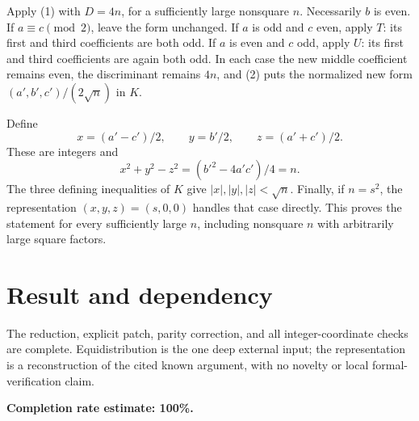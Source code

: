 \documentclass[11pt]{article}
\begin{document}
Apply (1) with $D=4n$, for a sufficiently large nonsquare $n$. Necessarily $b$ is even. If $a\equiv c\pmod2$, leave the form unchanged. If $a$ is odd and $c$ even, apply $T$: its first and third coefficients are both odd. If $a$ is even and $c$ odd, apply $U$: its first and third coefficients are again both odd. In each case the new middle coefficient remains even, the discriminant remains $4n$, and (2) puts the normalized new form $(a',b',c')/(2\sqrt n)$ in $K$.

Define
\[
 x=(a'-c')/2,\qquad y=b'/2,\qquad z=(a'+c')/2.
\]
These are integers and
\[
 x^2+y^2-z^2=(b'^2-4a'c')/4=n.
\]
The three defining inequalities of $K$ give $|x|,|y|,|z|<\sqrt n$. Finally, if $n=s^2$, the representation $(x,y,z)=(s,0,0)$ handles that case directly. This proves the statement for every sufficiently large $n$, including nonsquare $n$ with arbitrarily large square factors.

\section*{Result and dependency}
The reduction, explicit patch, parity correction, and all integer-coordinate checks are complete. Equidistribution is the one deep external input; the representation is a reconstruction of the cited known argument, with no novelty or local formal-verification claim.

\textbf{Completion rate estimate: 100\%.}
\end{document}
